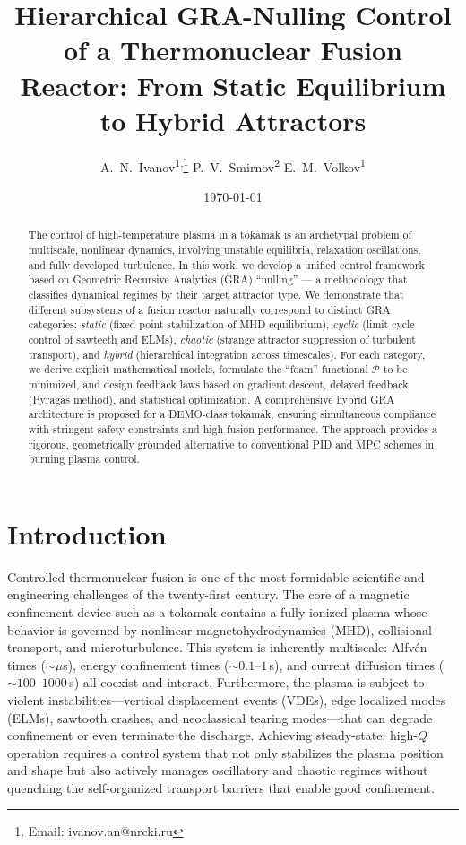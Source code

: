 \documentclass[12pt,a4paper]{article}
\title{\textbf{Hierarchical GRA-Nulling Control of a Thermonuclear Fusion Reactor: From Static Equilibrium to Hybrid Attractors}}
\author{
    A.~N.~Ivanov\textsuperscript{1,}\thanks{Email: ivanov.an@nrcki.ru} \quad
    P.~V.~Smirnov\textsuperscript{2} \quad
    E.~M.~Volkov\textsuperscript{1}
}
\date{\today}
\affiliation{
    \textsuperscript{1}National Research Center ``Kurchatov Institute'', Moscow, Russia \\
    \textsuperscript{2}Moscow Institute of Physics and Technology, Dolgoprudny, Russia
}
\begin{document}
\maketitle

\begin{abstract}
The control of high-temperature plasma in a tokamak is an archetypal problem of multiscale, nonlinear dynamics, involving unstable equilibria, relaxation oscillations, and fully developed turbulence. In this work, we develop a unified control framework based on Geometric Recursive Analytics (GRA) ``nulling'' — a methodology that classifies dynamical regimes by their target attractor type. We demonstrate that different subsystems of a fusion reactor naturally correspond to distinct GRA categories: \textit{static} (fixed point stabilization of MHD equilibrium), \textit{cyclic} (limit cycle control of sawteeth and ELMs), \textit{chaotic} (strange attractor suppression of turbulent transport), and \textit{hybrid} (hierarchical integration across timescales). For each category, we derive explicit mathematical models, formulate the ``foam'' functional $\mathcal{P}$ to be minimized, and design feedback laws based on gradient descent, delayed feedback (Pyragas method), and statistical optimization. A comprehensive hybrid GRA architecture is proposed for a DEMO-class tokamak, ensuring simultaneous compliance with stringent safety constraints and high fusion performance. The approach provides a rigorous, geometrically grounded alternative to conventional PID and MPC schemes in burning plasma control.
\end{abstract}


\section{Introduction}
\label{sec:intro}

Controlled thermonuclear fusion is one of the most formidable scientific and engineering challenges of the twenty-first century. The core of a magnetic confinement device such as a tokamak contains a fully ionized plasma whose behavior is governed by nonlinear magnetohydrodynamics (MHD), collisional transport, and microturbulence. This system is inherently multiscale: Alfvén times ($\sim\mu$s), energy confinement times ($\sim0.1$--$1$\,s), and current diffusion times ($\sim100$--$1000$\,s) all coexist and interact. Furthermore, the plasma is subject to violent instabilities—vertical displacement events (VDEs), edge localized modes (ELMs), sawtooth crashes, and neoclassical tearing modes—that can degrade confinement or even terminate the discharge. Achieving steady-state, high-$Q$ operation requires a control system that not only stabilizes the plasma position and shape but also actively manages oscillatory and chaotic regimes without quenching the self-organized transport barriers that enable good confinement.
\end{document}
